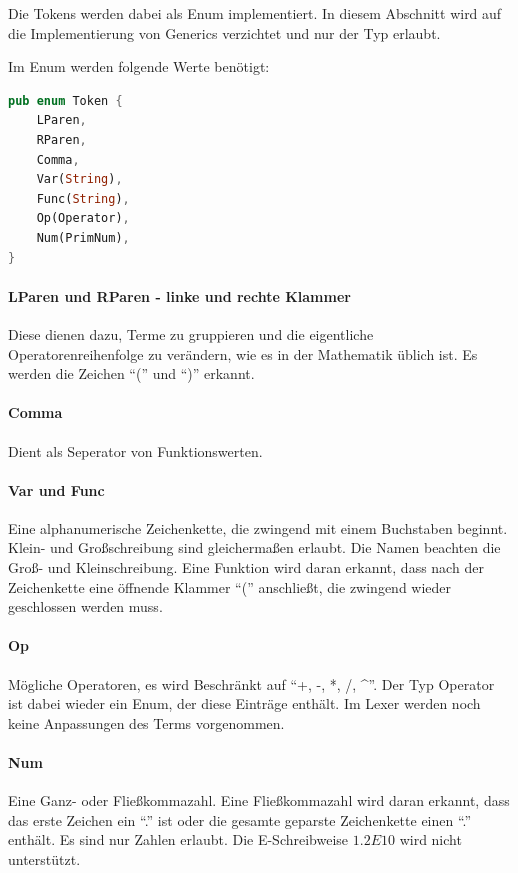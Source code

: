 \documentclass[11pt,a4paper, ngerman]{article}
\begin{document}
Die Tokens werden dabei als Enum implementiert. In diesem Abschnitt wird auf die Implementierung von Generics verzichtet und nur der Typ  erlaubt.

Im Enum werden folgende Werte benötigt:
\begin{lstlisting}[language=rust, caption={Enum Token}]
pub enum Token {
    LParen,
    RParen,
    Comma,
    Var(String),
    Func(String),
    Op(Operator),
    Num(PrimNum),
}
\end{lstlisting}

\paragraph{LParen und RParen - linke und rechte Klammer} Diese dienen dazu, Terme zu gruppieren und die eigentliche Operatorenreihenfolge zu verändern, wie es in der Mathematik üblich ist. Es werden die Zeichen ``('' und ``)'' erkannt.

\paragraph{Comma} Dient als Seperator von Funktionswerten.

\paragraph{Var und Func} Eine alphanumerische Zeichenkette, die zwingend mit einem Buchstaben beginnt. Klein- und Großschreibung sind gleichermaßen erlaubt. Die Namen beachten die Groß- und Kleinschreibung. Eine Funktion wird daran erkannt, dass nach der Zeichenkette eine öffnende Klammer ``('' anschließt, die zwingend wieder geschlossen werden muss.

\paragraph{Op} Mögliche Operatoren, es wird Beschränkt auf ``+, -, *, /, \^{}''. Der Typ Operator ist dabei wieder ein Enum, der diese Einträge enthält. Im Lexer werden noch keine Anpassungen des Terms vorgenommen.

\paragraph{Num} Eine Ganz- oder Fließkommazahl. Eine Fließkommazahl wird daran erkannt, dass das erste Zeichen ein ``.'' ist oder die gesamte geparste Zeichenkette einen ``.'' enthält. Es sind nur Zahlen erlaubt. Die E-Schreibweise $1.2E10$ wird nicht unterstützt.
\end{document}
